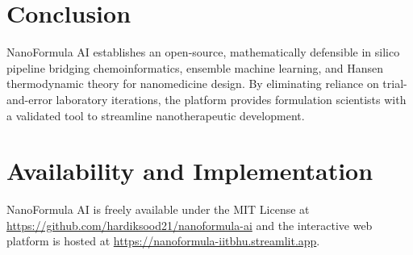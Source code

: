\documentclass[twocolumn,10pt,3p]{elsarticle}
\begin{document}
\section{Conclusion}
NanoFormula AI establishes an open-source, mathematically defensible in silico pipeline bridging chemoinformatics, ensemble machine learning, and Hansen thermodynamic theory for nanomedicine design. By eliminating reliance on trial-and-error laboratory iterations, the platform provides formulation scientists with a validated tool to streamline nanotherapeutic development.

\section*{Availability and Implementation}
NanoFormula AI is freely available under the MIT License at \url{https://github.com/hardiksood21/nanoformula-ai} and the interactive web platform is hosted at \url{https://nanoformula-iitbhu.streamlit.app}.



\end{document}
